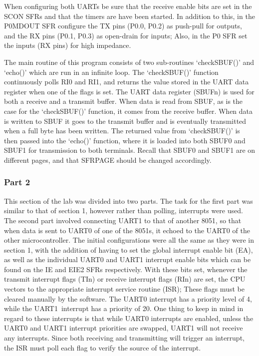 \documentclass[12pt]{article}
\newcommand{\uo}{UART1}
\begin{document}
When configuring both UARTs be sure that the receive enable bits are set in the SCON SFRs and that the timers are have been started. In addition to this, in the P0MDOUT SFR configure the TX pins (P0.0, P0.2) as push-pull for outputs, and the RX pins (P0.1, P0.3) as open-drain for inputs; Also, in the P0 SFR set the inputs (RX pins) for high impedance. 

The main routine of this program consists of two sub-routines `checkSBUF()' and `echo()' which are run in an infinite loop. The `checkSBUF()' function continuously polls RI0 and RI1, and returns the value stored in the UART data register when one of the flags is set. The UART data register (SBUFn) is used for both a receive and a transmit buffer. When data is read from SBUF, as is the case for the `checkSBUF()' function, it comes from the receive buffer. When data is written to SBUF it goes to the transmit buffer and is eventually transmitted when a full byte has been written. The returned value from `checkSBUF()' is then passed into the `echo()' function, where it is loaded into both SBUF0 and SBUF1 for transmission to both terminals. Recall that SBUF0 and SBUF1 are on different pages, and that SFRPAGE should be changed accordingly. 

\subsubsection{Part 2}
This section of the lab was divided into two parts.
The task for the first part was similar to that of section 1, however rather than polling, interrupts were used. The second part involved connecting UART1 to that of another 8051, so that when data is sent to UART0 of one of the 8051s, it echoed to the UART0 of the other microcontroller. The initial configurations were all the same as they were in section 1, with the addition of having to set the global interrupt enable bit (EA), as well as the individual UART0 and UART1 interrupt enable bits which can be found on the IE and EIE2 SFRs respectively. With these bits set, whenever the transmit interrupt flags (TIn) or receive interrupt flags (RIn) are set, the CPU vectors to the appropriate interrupt service routine (ISR); These flags must be cleared manually by the software. The UART0 interrupt has a priority level of 4, while the \uo\ interrupt has a priority of 20. One thing to keep in mind in regard to these interrupts is that while UART0 interrupts are enabled, unless the UART0 and UART1 interrupt priorities are swapped, UART1 will not receive any interrupts. Since both receiving and transmitting will trigger an interrupt, the ISR must poll each flag to verify the source of the interrupt. 
\end{document}

